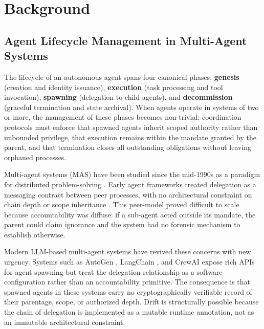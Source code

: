 \section{Background}
\label{sec:background}

\subsection{Agent Lifecycle Management in Multi-Agent Systems}
\label{sec:agent-lifecycle}

The lifecycle of an autonomous agent spans four canonical phases: \textbf{genesis} (creation and identity issuance), \textbf{execution} (task processing and tool invocation), \textbf{spawning} (delegation to child agents), and \textbf{decommission} (graceful termination and state archival). When agents operate in systems of two or more, the management of these phases becomes non-trivial: coordination protocols must enforce that spawned agents inherit scoped authority rather than unbounded privilege, that execution remains within the mandate granted by the parent, and that termination closes all outstanding obligations without leaving orphaned processes.

Multi-agent systems (MAS) have been studied since the mid-1990s as a paradigm for distributed problem-solving \cite{wooldridge1995,stone2000}. Early agent frameworks treated delegation as a messaging contract between peer processes, with no architectural constraint on chain depth or scope inheritance \cite{ferber1996}. This peer-model proved difficult to scale because accountability was diffuse: if a sub-agent acted outside its mandate, the parent could claim ignorance and the system had no forensic mechanism to establish otherwise. 

Modern LLM-based multi-agent systems have revived these concerns with new urgency. Systems such as AutoGen \cite{autogen2023}, LangChain \cite{langchain2023}, and CrewAI \cite{crewai2024} expose rich APIs for agent spawning but treat the delegation relationship as a software configuration rather than an accountability primitive. The consequence is that spawned agents in these systems carry no cryptographically verifiable record of their parentage, scope, or authorized depth. Drift is structurally possible because the chain of delegation is implemented as a mutable runtime annotation, not as an immutable architectural constraint.


